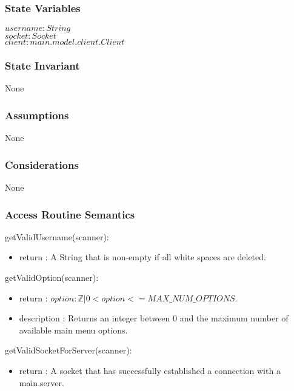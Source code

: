 \documentclass[12pt, titlepage]{article}
\begin{document}
    \subsubsection* {State Variables}
        $\mathit{username}: String$\\
        $\mathit{socket}: Socket$\\
        $\mathit{client} : main.model.client.Client$\\
    
    \subsubsection* {State Invariant}
        None
    
    \subsubsection* {Assumptions}
        None
    
    \subsubsection* {Considerations}
        None
    
    \subsubsection* {Access Routine Semantics}
    
        \noindent getValidUsername(scanner):
        \begin{itemize}
        \item return : A String that is non-empty if all white spaces are deleted.
        \end{itemize}
        
        \noindent getValidOption(scanner):
        \begin{itemize}
        \item return : $option : \mathbb{Z} | 0 < option <= MAX\_NUM\_OPTIONS$.
        \item description : Returns an integer between 0 and the maximum number of available main menu options.
        \end{itemize}
        
        \noindent getValidSocketForServer(scanner):
        \begin{itemize}
        \item return : A socket that has successfully established a connection with a main.server.
        \end{itemize}
        
\end{document}
